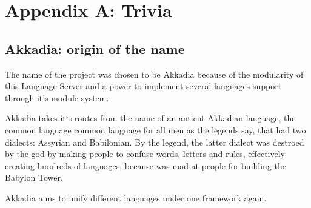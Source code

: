 \chapter{Appendix A: Trivia}
\label{trivia}

\section{Akkadia: origin of the name}
\label{trivia:akkadia}

The name of the project was chosen to be Akkadia because of the modularity of this Language Server
and a power to implement several languages support through it's module system.

Akkadia takes it`s routes from the name of an antient Akkadian language, the common language common language for all men
as the legends say, that had two dialects: Assyrian and Babilonian.
By the legend, the latter dialect was destroed by the god by making people to confuse words, letters and rules, effectively creating hundreds of languages,
because was mad at people for building the Babylon Tower.

Akkadia aims to unify different languages under one framework again.